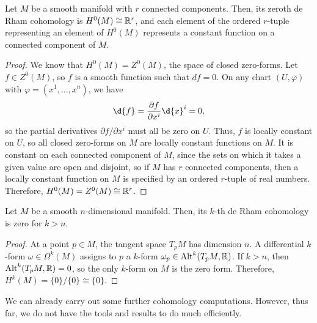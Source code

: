 \documentclass[a4paper,12pt]{article}
\begin{document}
\begin{proposition}\label{prop:de_rham_cohomology_connected_components}
    Let $M$ be a smooth manifold with $r$ connected components.
    Then, its zeroth de Rham cohomology is $H^0(M) \cong \mathbb{R}^r$, and each element of the ordered $r$-tuple representing an element of $H^0(M)$ represents a constant function on a connected component of $M$.
\end{proposition}
\begin{proof}
    We know that $H^0(M) = Z^0(M)$, the space of closed zero-forms.
    Let $f \in Z^0(M)$, so $f$ is a smooth function such that $d{f} = 0$.
    On any chart $(U, \varphi)$ with $\varphi = (x^1, \ldots, x^n)$, we have
    \begin{equation*}
        \d{f} = \frac{\partial f}{\partial x^i} \d{x}^i = 0,
    \end{equation*}
    so the partial derivatives $\partial f / \partial x^i$ must all be zero on $U$.
    Thus, $f$ is locally constant on $U$, so all closed zero-forms on $M$ are locally constant functions on $M$.
    It is constant on each connected component of $M$, since the sets on which it takes a given value are open and disjoint, so if $M$ has $r$ connected components, then a locally constant function on $M$ is specified by an ordered $r$-tuple of real numbers.
    Therefore, $H^0(M) = Z^0(M) \cong \mathbb{R}^r$.
\end{proof}
\begin{proposition}\label{prop:de_rham_cohomology_max_dimension}
    Let $M$ be a smooth $n$-dimensional manifold.
    Then, its $k$-th de Rham cohomology is zero for $k > n$.
\end{proposition}
\begin{proof}
    At a point $p \in M$, the tangent space $T_p M$ has dimension $n$.
    A differential $k$-form $\omega \in \Omega^k(M)$ assigns to $p$ a $k$-form $\omega_p \in \operatorname{Alt}^k(T_p M, \mathbb{R})$.
    If $k > n$, then $\operatorname{Alt}^k(T_p M, \mathbb{R}) = 0$, so the only $k$-form on $M$ is the zero form.
    Therefore, $H^k(M) = \{0\} / \{0\} \cong \{0\}$.
\end{proof}
We can already carry out some further cohomology computations.
However, thus far, we do not have the tools and results to do much efficiently.
\end{document}
